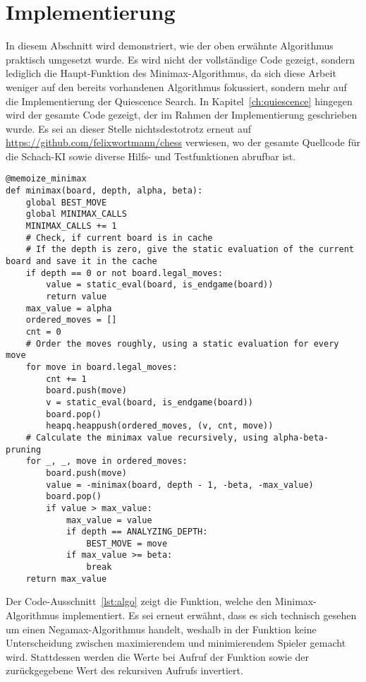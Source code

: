 \section{Implementierung}
In diesem Abschnitt wird demonstriert, wie der oben erwähnte Algorithmus praktisch umgesetzt wurde. Es wird nicht der vollständige Code gezeigt, sondern lediglich die Haupt-Funktion des Minimax-Algorithmus, da sich diese Arbeit weniger auf den bereits vorhandenen Algorithmus fokussiert, sondern mehr auf die Implementierung der Quiescence Search. In Kapitel~\ref{ch:quiescence} hingegen wird der gesamte Code gezeigt, der im Rahmen der Implementierung geschrieben wurde. Es sei an dieser Stelle nichtsdestotrotz erneut auf \url{https://github.com/felixwortmann/chess} verwiesen, wo der gesamte Quellcode für die Schach-KI sowie diverse Hilfs- und Testfunktionen abrufbar ist.

\begin{lstlisting}[caption=Funktion für den Minimax-Algorithmus mit Alpha-Beta-Pruning, label=lst:algo]
@memoize_minimax
def minimax(board, depth, alpha, beta):
    global BEST_MOVE
    global MINIMAX_CALLS
    MINIMAX_CALLS += 1
    # Check, if current board is in cache
    # If the depth is zero, give the static evaluation of the current board and save it in the cache
    if depth == 0 or not board.legal_moves:
        value = static_eval(board, is_endgame(board))
        return value
    max_value = alpha
    ordered_moves = []
    cnt = 0
    # Order the moves roughly, using a static evaluation for every move
    for move in board.legal_moves:
        cnt += 1
        board.push(move)
        v = static_eval(board, is_endgame(board))
        board.pop()
        heapq.heappush(ordered_moves, (v, cnt, move))
    # Calculate the minimax value recursively, using alpha-beta-pruning
    for _, _, move in ordered_moves:
        board.push(move)
        value = -minimax(board, depth - 1, -beta, -max_value)
        board.pop()
        if value > max_value:
            max_value = value
            if depth == ANALYZING_DEPTH:
                BEST_MOVE = move
            if max_value >= beta:
                break
    return max_value
\end{lstlisting}

Der Code-Ausschnitt~\ref{lst:algo} zeigt die Funktion, welche den Minimax-Algorithmus implementiert. Es sei erneut erwähnt, dass es sich technisch gesehen um einen Negamax-Algorithmus handelt, weshalb in der Funktion keine Unterscheidung zwischen maximierendem und minimierendem Spieler gemacht wird. Stattdessen werden die Werte bei Aufruf der Funktion sowie der zurückgegebene Wert des rekursiven Aufrufs invertiert.

